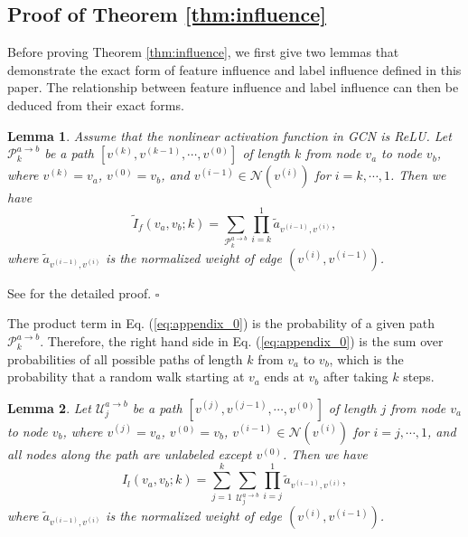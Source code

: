 \documentclass{article}
\newtheorem{lemma}{Lemma}
\newenvironment{proof}{{\noindent\it Proof.}\quad}{\hfill $\square$\par}
\begin{document}
		
	\subsection{Proof of Theorem \ref{thm:influence}}
	\label{app:b}
		Before proving Theorem \ref{thm:influence}, we first give two lemmas that demonstrate the exact form of feature influence and label influence defined in this paper.
		The relationship between feature influence and label influence can then be deduced from their exact forms.
		\begin{lemma}
		\label{lemma:1}
			Assume that the nonlinear activation function in GCN is ReLU.
			Let $\mathcal P_k^{a \rightarrow b}$ be a path $[v^{(k)}, v^{(k-1)},\cdots, v^{(0)}]$ of length $k$ from node $v_a$ to node $v_b$, where $v^{(k)} = v_a$, $v^{(0)} = v_b$, and $v^{(i-1)} \in \mathcal N(v^{(i)})$ for $i = k,\cdots, 1$.
			Then we have
			\begin{equation}
			\label{eq:appendix_0}
				 \tilde I_f(v_a, v_b; k) = \sum_{\mathcal P_k^{a \rightarrow b}} \prod_{i=k}^1 \tilde a_{v^{(i-1)}, v^{(i)}},
			\end{equation}
			where $\tilde a_{v^{(i-1)}, v^{(i)}}$ is the normalized weight of edge $(v^{(i)}, v^{(i-1)})$.
		\end{lemma}
		
		\begin{proof}
			See \cite{xu2018representation} for the detailed proof.
		\end{proof}
		
		The product term in Eq. (\ref{eq:appendix_0}) is the probability of a given path $\mathcal P_k^{a \rightarrow b}$.
		Therefore, the right hand side in Eq. (\ref{eq:appendix_0}) is the sum over probabilities of all possible paths of length $k$ from $v_a$ to $v_b$, which is the probability that a random walk starting at $v_a$ ends at $v_b$ after taking $k$ steps.
		
		\begin{lemma}
		\label{lemma:2}
			Let $\mathcal U_j^{a \rightarrow b}$ be a path $[v^{(j)}, v^{(j-1)},\cdots, v^{(0)}]$ of length $j$ from node $v_a$ to node $v_b$, where $v^{(j)} = v_a$, $v^{(0)} = v_b$, $v^{(i-1)} \in \mathcal N(v^{(i)})$ for $i = j,\cdots, 1$, and all nodes along the path are unlabeled except $v^{(0)}$.
			Then we have
			\begin{equation}
				I_l(v_a, v_b; k) = \sum_{j=1}^k \sum_{\mathcal U_j^{a \rightarrow b}} \prod_{i=j}^1 \tilde a_{v^{(i-1)}, v^{(i)}},
			\end{equation}
			where $\tilde a_{v^{(i-1)}, v^{(i)}}$ is the normalized weight of edge $(v^{(i)}, v^{(i-1)})$.
		\end{lemma}
		
\end{document}

